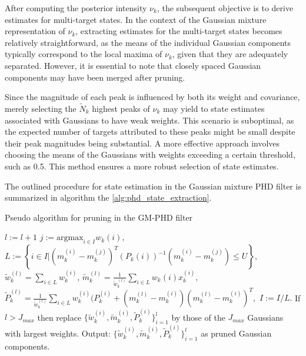 After computing the posterior intensity $\nu_k$, the subsequent objective is to derive estimates for multi-target states. In the context of the Gaussian mixture representation of $\nu_k$, extracting estimates for the multi-target states becomes relatively straightforward, as the means of the individual Gaussian components typically correspond to the local maxima of $\nu_k$, given that they are adequately separated. However, it is essential to note that closely spaced Gaussian components may have been merged after pruning.

Since the magnitude of each peak is influenced by both its weight and covariance, merely selecting the $\tilde{N}_k$ highest peaks of $\nu_k$ may yield to state estimates associated with Gaussians to have weak weights. This scenario is suboptimal, as the expected number of targets attributed to these peaks might be small despite their peak magnitudes being substantial. A more effective approach involves choosing the means of the Gaussians with weights exceeding a certain threshold, such as 0.5. This method ensures a more robust selection of state estimates.

The outlined procedure for state estimation in the Gaussian mixture PHD filter is summarized in algorithm the \ref{alg:phd_state_extraction}.

\begin{algorithm}
    \caption{Pseudo algorithm for pruning in the GM-PHD filter}
    \begin{algorithmic}[1]
            \State $l:= l+1$
            \State $j:= \text{argmax}_{i \in I} w_k{(i)},$
            \State $L:= \left\{ i \in I | (m_k^{(i)} - m_k^{(j)})^T (P_k{(i)})^{-1} (m_k^{(i)} - m_k^{(j)}) \leq U \right\},$
            \State $\tilde{w}_k^{(l)} = \sum_{i \in L} w_k^{(i)}$,
            \State $\tilde{m}_k^{(l)} = \frac{1}{\tilde{w}_k^{(l)}} \sum_{i \in L} w_k{(i)} x_k^{(i)},$
            \State $\tilde{P}_k^{(l)} = \frac{1}{\tilde{w}_k^{(l)}} \sum_{i \in L} w_k^{(i)} (P_k^{(i)} + (m_k^{(l)} - m _k^{(i)}) (m_k^{(l)} - m _k^{(i)})^T,$
            \State $I:= I/L.$
        \EndWhile
        \EndProcedure
        \State
        \State If $l > J_{max}$ then replace $\{ \tilde{w}_k^{(i)}, \tilde{m}_k^{(i)}, \tilde{P}_k^{(i)} \}_{i=1}^l$
        by those of the $J_{max}$ Gaussians with largest weights.
        \State
        \State Output: $\{ \tilde{w}_k^{(i)}, \tilde{m}_k^{(i)}, \tilde{P}_k^{(i)} \}_{i=1}^l$ as pruned Gaussian components.

    \end{algorithmic}
    \label{alg:phd_merging}
\end{algorithm}

